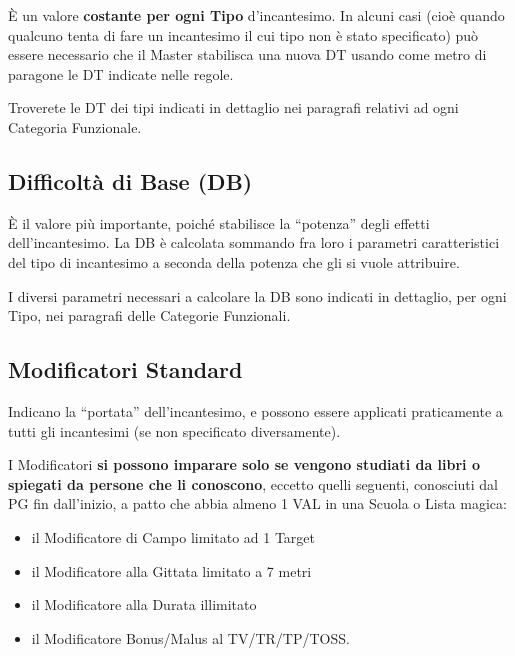\`E un valore \textbf{costante per ogni Tipo} d'incantesimo. In alcuni casi
(cio\`e quando qualcuno tenta di fare un incantesimo il cui tipo non
\`e stato specificato) pu\`o essere necessario che il Master
stabilisca una nuova DT usando come metro di paragone le DT indicate
nelle regole.

Troverete le DT dei tipi indicati in dettaglio nei paragrafi relativi
ad ogni Categoria Funzionale.


\subsection{Difficolt\`a di Base (DB)} 

\`E il valore pi\`u importante, poich\'e stabilisce la ``potenza''
degli effetti dell'incantesimo. La DB \`e calcolata sommando fra
loro i parametri caratteristici del tipo di incantesimo a seconda
della potenza che gli si vuole attribuire.

I diversi parametri necessari a calcolare la DB sono indicati in
dettaglio, per ogni Tipo, nei paragrafi delle Categorie Funzionali.


\subsection{Modificatori Standard} 

Indicano la ``portata'' dell'incantesimo, e possono essere applicati
praticamente a tutti gli incantesimi (se non specificato
diversamente). 

I Modificatori \textbf{si possono imparare solo se vengono
studiati da libri o spiegati da persone che li conoscono}, 
eccetto quelli seguenti, conosciuti dal PG fin dall'inizio, 
a patto che abbia almeno 1 VAL in una Scuola o Lista magica:

\begin{itemize}\itemsep -6pt
\item il Modificatore di Campo limitato ad 1 Target
\item il Modificatore alla Gittata limitato a 7 metri
\item il Modificatore alla Durata illimitato
\item il Modificatore Bonus/Malus al TV/\-TR/\-TP/\-TOSS.  
\end{itemize}

